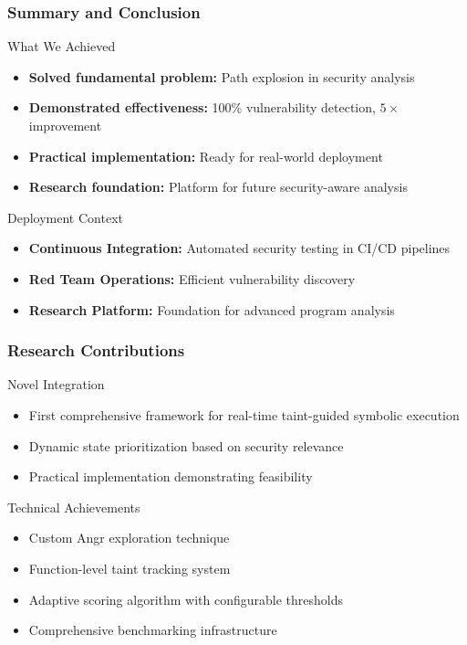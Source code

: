 \documentclass[aspectratio=169]{beamer}
\begin{document}
\begin{frame}
    \frametitle{Summary and Conclusion}
    \begin{evaluation}{What We Achieved}
        \begin{itemize}
            \item \textbf{Solved fundamental problem:} Path explosion in security analysis
            \item \textbf{Demonstrated effectiveness:} 100\% vulnerability detection, $5 \times$ improvement
            \item \textbf{Practical implementation:} Ready for real-world deployment
            \item \textbf{Research foundation:} Platform for future security-aware analysis
        \end{itemize}
    \end{evaluation}
    
    \begin{implementation}{Deployment Context}
        \begin{itemize}
            \item \textbf{Continuous Integration:} Automated security testing in CI/CD pipelines
            \item \textbf{Red Team Operations:} Efficient vulnerability discovery
            \item \textbf{Research Platform:} Foundation for advanced program analysis
        \end{itemize}
    \end{implementation}
\end{frame}

\begin{frame}
    \frametitle{Research Contributions}
    \begin{research}{Novel Integration}
        \begin{itemize}
            \item First comprehensive framework for real-time taint-guided symbolic execution
            \item Dynamic state prioritization based on security relevance
            \item Practical implementation demonstrating feasibility
        \end{itemize}
    \end{research}
    
    \vspace{1em}
    \begin{implementation}{Technical Achievements}
        \begin{itemize}
            \item Custom Angr exploration technique
            \item Function-level taint tracking system
            \item Adaptive scoring algorithm with configurable thresholds
            \item Comprehensive benchmarking infrastructure
        \end{itemize}
    \end{implementation}
\end{frame}
\end{document}
